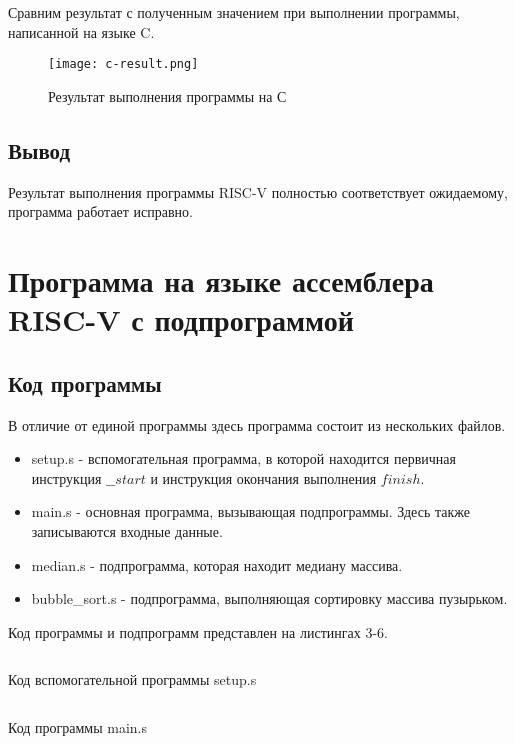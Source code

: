 Сравним результат с полученным значением при выполнении программы, написанной на языке C.

\begin{figure}[H]
	\centering
	\texttt{[image: c-result.png]}
	\caption{Результат выполнения программы на С}
\end{figure}

\subsection{Вывод}
Результат выполнения программы RISC-V полностью соответствует ожидаемому, программа работает исправно.

\newpage

\section{Программа на языке ассемблера RISC-V с подпрограммой}

\subsection{Код программы}
В отличие от единой программы здесь программа состоит из нескольких файлов.
\begin{itemize}
	\item setup.s - вспомогательная программа, в которой находится первичная инструкция \(\_\_start\) и инструкция окончания выполнения \(finish\).
	\item main.s - основная программа, вызывающая подпрограммы. Здесь также записываются входные данные.
	\item median.s - подпрограмма, которая находит медиану массива.
	\item bubble\_sort.s - подпрограмма, выполняющая сортировку массива пузырьком.
\end{itemize}

Код программы и подпрограмм представлен на листингах 3-6.

\begin{code}
	\inputminted[breaklines=true, xleftmargin=1em, linenos, frame=single, framesep=10pt, fontsize=\footnotesize, firstline=1]{asm}{listings/setup.s}
	\caption{Код вспомогательной программы setup.s}
\end{code}

\begin{code}
	\inputminted[breaklines=true, xleftmargin=1em, linenos, frame=single, framesep=10pt, fontsize=\footnotesize, firstline=1]{asm}{listings/main.s}
	\caption{Код программы main.s}
\end{code}

